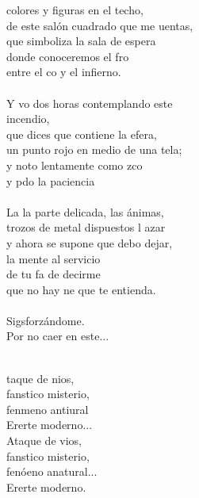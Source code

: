 \begin{cancion}%
	 colores y figuras en el techo,\\
	de este salón cuadrado que me uentas,\\
que simboliza la sala de espera\\
	donde conoceremos el fro \\
	entre el co y el infierno.\\
\jump\\
	Y vo dos horas contemplando este \\
incendio,\\
	que dices que contiene la efera,\\
un punto rojo en medio de una tela;\\
	y noto lentamente como zco \\
	y pdo la paciencia\\
\jump\\
	La la parte delicada, las ánimas,\\
	trozos de metal dispuestos l azar\\
y ahora se supone que debo dejar,\\
la mente al servicio\\
	de tu fa de decirme\\
	que no hay ne que te entienda.\\
\jump\\
	Sigsforzándome.\\
Por no caer en este...\\\jump\\
	\begin{chorus}%
	taque de nios,\\
	fanstico misterio, \\
	fenmeno antiural \\
	Ererte moderno...\\
	Ataque de vios,\\
	fanstico misterio, \\
	fenóeno anatural...\\
	Ererte moderno.\\
	\end{chorus}%

\end{cancion}
